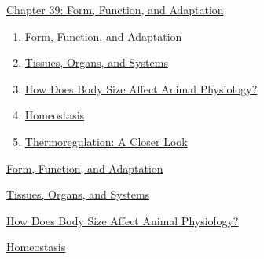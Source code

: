 \documentclass[12pt,letterpaper]{article}
\begin{document}
\begin{chapbox}{\hyperlink{home}{Chapter 39: Form, Function, and Adaptation}}
    \begin{enumerate}
        \item \hyperlink{39.1}{Form, Function, and Adaptation}
        \item \hyperlink{39.2}{Tissues, Organs, and Systems}
        \item \hyperlink{39.3}{How Does Body Size Affect Animal Physiology?}
        \item \hyperlink{39.4}{Homeostasis}
        \item \hyperlink{39.5}{Thermoregulation: A Closer Look}
    \end{enumerate}
\end{chapbox}
\hypertarget{39.1}{}
\begin{secbox}{\hyperlink{39}{Form, Function, and Adaptation}}{

}\end{secbox}
\hypertarget{39.2}{}
\begin{secbox}{\hyperlink{39}{Tissues, Organs, and Systems}}{

}\end{secbox}
\hypertarget{39.3}{}
\begin{secbox}{\hyperlink{39}{How Does Body Size Affect Animal Physiology?}}{

}\end{secbox}
\hypertarget{39.4}{}
\begin{secbox}{\hyperlink{39}{Homeostasis}}{

}\end{secbox}
\end{document}
